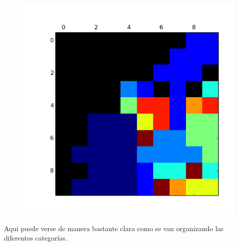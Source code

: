 \begin{figure}[h!]
\begin{minipage}{.15\textwidth}
  \label{fig:test2}
\end{minipage}
\begin{minipage}{.15\textwidth}
  \centering
  \includegraphics[width=.9\linewidth]{convergencia_kohonen/entrenamiento_100.png}
  \label{fig:test2}
\end{minipage}
\end{figure}

Aqui puede verse de manera bastante clara como se van organizando las diferentes categorías.